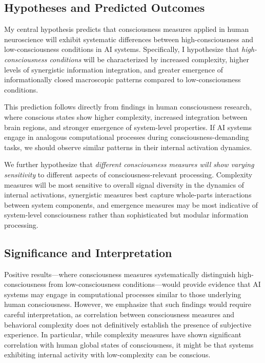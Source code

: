 \documentclass[11pt,a4paper]{article}
\begin{document}
\subsection{Hypotheses and Predicted Outcomes}

My central hypothesis predicts that consciousness measures applied in human neuroscience will exhibit systematic differences between high-consciousness and low-consciousness conditions in AI systems. Specifically, I hypothesize that \textit{high-consciousness conditions} will be characterized by increased complexity, higher levels of synergistic information integration, and greater emergence of informationally closed macroscopic patterns compared to low-consciousness conditions.

This prediction follows directly from findings in human consciousness research, where conscious states show higher complexity, increased integration between brain regions, and stronger emergence of system-level properties. If AI systems engage in analogous computational processes during consciousness-demanding tasks, we should observe similar patterns in their internal activation dynamics.

We further hypothesize that \textit{different consciousness measures will show varying sensitivity} to different aspects of consciousness-relevant processing. Complexity measures will be most sensitive to overall signal diversity in the dynamics of internal activations, synergistic measures best capture whole-parts interactions between system components, and emergence measures may be most indicative of system-level consciousness rather than sophisticated but modular information processing.

\subsection{Significance and Interpretation}

Positive results—where consciousness measures systematically distinguish high-consciousness from low-consciousness conditions—would provide evidence that AI systems may engage in computational processes similar to those underlying human consciousness. However, we emphasize that such findings would require careful interpretation, as correlation between consciousness measures and behavioral complexity does not definitively establish the presence of subjective experience. In particular, while complexity measures have shown significant correlation with human global states of consciousness, it might be that systems exhibiting internal activity with low-complexity can be conscious.
\end{document}
